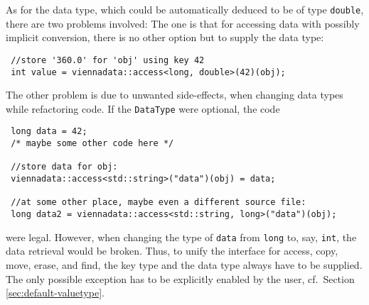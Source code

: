As for the data type, which could be automatically deduced to be of type \lstinline|double|, there are two problems involved:
The one is that for accessing data with possibly implicit conversion, there is no other option but to supply the data type:
\begin{lstlisting}
 //store '360.0' for 'obj' using key 42
 int value = viennadata::access<long, double>(42)(obj);
\end{lstlisting}
The other problem is due to unwanted side-effects, when changing data types while refactoring code. If the \lstinline|DataType| were optional, the code
\begin{lstlisting}
 long data = 42;
 /* maybe some other code here */

 //store data for obj:
 viennadata::access<std::string>("data")(obj) = data;

 //at some other place, maybe even a different source file:
 long data2 = viennadata::access<std::string, long>("data")(obj);
\end{lstlisting}
were legal. However, when changing the type of \lstinline|data| from \lstinline|long| to, say, \lstinline|int|, the data retrieval would be broken.
Thus, to unify the interface for access, copy, move, erase, and find, the key type and the data type always have to be supplied. 
The only possible exception has to be explicitly enabled by the user, cf.~Section \ref{sec:default-valuetype}.



% 
% 

